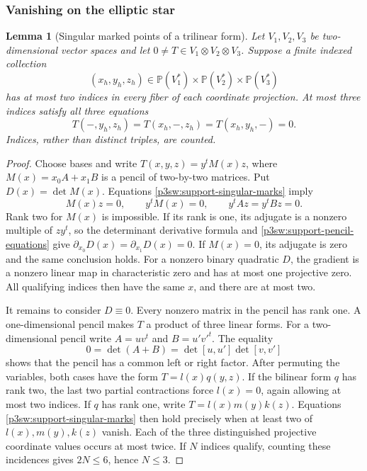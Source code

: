 \documentclass[11pt]{article}
\newtheorem{lemma}[theorem]{Lemma}
\numberwithin{equation}{section}
\begin{document}
\subsubsection{Vanishing on the elliptic star}

\begin{lemma}[Singular marked points of a trilinear form]
\label{p3sw:support-trilinear}
Let \(V_1,V_2,V_3\) be two-dimensional vector spaces and let
\(0\ne T\in V_1\otimes V_2\otimes V_3\).  Suppose a finite indexed
collection
\[
 (x_h,y_h,z_h)\in
 \mathbb P(V_1^*)\times\mathbb P(V_2^*)\times\mathbb P(V_3^*)
\]
has at most two indices in every fiber of each coordinate projection.
At most three indices satisfy all three equations
\begin{equation}
 T(-,y_h,z_h)=T(x_h,-,z_h)=T(x_h,y_h,-)=0.
 \label{p3sw:support-singular-marks}
\end{equation}
Indices, rather than distinct triples, are counted.
\end{lemma}

\begin{proof}
Choose bases and write \(T(x,y,z)=y^tM(x)z\), where
\(M(x)=x_0A+x_1B\) is a pencil of two-by-two matrices.  Put
\(D(x)=\det M(x)\).  Equations \eqref{p3sw:support-singular-marks} imply
\begin{equation}
 M(x)z=0,\qquad y^tM(x)=0,\qquad y^tAz=y^tBz=0.
 \label{p3sw:support-pencil-equations}
\end{equation}
Rank two for \(M(x)\) is impossible.  If its rank is one, its adjugate
is a nonzero multiple of \(zy^t\), so the determinant derivative
formula and \eqref{p3sw:support-pencil-equations} give
\(\partial_{x_0}D(x)=\partial_{x_1}D(x)=0\).
If \(M(x)=0\), its adjugate is zero and the same conclusion holds.
For a nonzero binary quadratic \(D\), the gradient is a nonzero linear
map in characteristic zero and has at most one projective zero.
All qualifying indices then have the same \(x\), and there are at
most two.

It remains to consider \(D\equiv0\).  Every nonzero matrix in the
pencil has rank one.  A one-dimensional pencil makes \(T\) a product
of three linear forms.  For a two-dimensional pencil write
\(A=uv^t\) and \(B=u'v'^t\).  The equality
\[
 0=\det(A+B)=\det[u,u']\det[v,v']
\]
shows that the pencil has a common left or right factor.  After
permuting the variables, both cases have the form
\(T=l(x)q(y,z)\).  If the bilinear form \(q\) has rank two, the last
two partial contractions force \(l(x)=0\), again allowing at most two
indices.  If \(q\) has rank one, write \(T=l(x)m(y)k(z)\).
Equations \eqref{p3sw:support-singular-marks} then hold precisely when at least two of
\(l(x),m(y),k(z)\) vanish.  Each of the three distinguished
projective coordinate values occurs at most twice.  If \(N\) indices
qualify, counting these incidences gives \(2N\leq6\), hence \(N\leq3\).
\end{proof}
\end{document}
